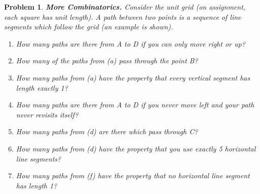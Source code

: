 \documentclass{article}
\newtheorem{problem}{Problem}
\theoremstyle{definition}
\begin{document}
\begin{problem}\textbf{More Combinatorics. }
Consider the unit grid (on assignment, each square has unit length). A path between two points is a sequence of line segments which follow the grid (an example is shown). 

\begin{enumerate}[label = \alph*)]
    \item How many paths are there from A to D if you can only move right or up?
    
    \item How many of the paths from (a) pass through the point B?
    
    \item How many paths from (a) have the property that every vertical segment has length exactly 1?
    
    \item How many paths are there from A to D if you never move left and your path never revisits itself?
    
    \item How many paths from (d) are there which pass through C?
    
    \item How many paths from (d) have the property that you use exactly 5 horizontal line segments?
    
    \item How many paths from (f) have the property that no horizontal line segment has length 1?
\end{enumerate}
\end{problem}
\end{document}

